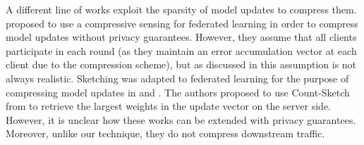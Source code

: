 \documentclass[accepted]{uai2021} %
\begin{document}
A different line of works exploit the sparsity of model updates to compress them.
 \cite{mohamedamiri,mohamedamiri2}  proposed to use a compressive sensing for federated learning in order to compress model updates without privacy guarantees. However, they assume that all clients participate in each round (as they maintain an error accumulation vector at each client due to the compression scheme), but as discussed in \cite{kairouz2019advances} this assumption is not always realistic. %
Sketching was adapted to federated learning for the purpose of compressing model updates in \cite{ivkin2019communication} and \cite{rothchild2020fetchsgd}. The authors proposed to use Count-Sketch from \cite{charikar2002finding} to retrieve the largest weights in the update vector on the server side. 
However, it is unclear how these works can be extended with privacy guarantees. Moreover, unlike our technique, they do not compress downstream traffic.
\end{document}
